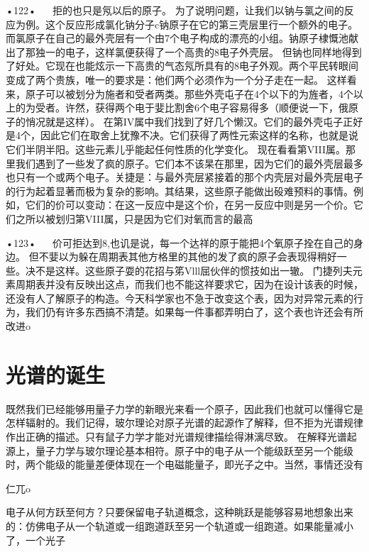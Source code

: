 •122•
  
拒的也只是氖以后的原子。
为了说明问题，让我们以钠与氯之间的反应为例。这个反应形成氯化钠分子c钠原子在它的第三壳层里行一个额外的电子。而氯原子在自己的最外壳层有一个由7个电子构成的漂亮的小组。钠原子棣慨池献出了那独一的电子，这样氯便获得了一个高贵的8电子外壳层。
但钠也同样地得到了好处。它现在也能炫示一下高贵的气态氖所具有的8电子外观。两个平民转眼间变成了两个贵族，唯一的要求是：他们两个必须作为一个分子走在一起。
这样看来，原子可以被划分为施者和受者两类。那些外壳屯子在4个以下的为旌者，4个以上的为受者。许然，获得两个电于婓比割舍6个电子容易得多（顺便说一下，俄原子的悄况就是这样）。
在第IV属中我们找到了好几个懒汉。它们的最外壳屯子正好是4个，因此它们在取舍上犹豫不决。它们获得了两性元索这样的名称，也就是说它们半阴半阳。这些元素儿乎能起任何性质的化学变化。
现在看看第VIII属。那里我们遇到了一些发了疯的原子。它们本不该杲在那里，因为它们的最外壳层最多也只有一个或两个电子。关捷是：与最外壳层紧接着的那个内壳层对最外壳层电子的行为起着显著而极为复杂的影响。其结果，这些原子能做出砓难预料的事情。例如，它们的价可以变动：在这一反应中是这个价，在另一反应中则是另一个价。它们之所以被划归第VIII属，只是因为它们对氧而言的最高

•123•
  
价可拒达到8,也讥是说，每一个达祥的原于能把4个氧原子拴在自己的身边。
但不婓以为躲在周期表其他方格里的其他的发了疯的原子会表现得稍好一些。决不是这样。这些原子耍的花招与笫Vlll屈伙伴的惯技如出一辙。
门捷列夫元素周期表并没有反映出这点，而我们也不能这祥要求它，因为在设计该表的时候，还没有人了解原子的构造。今天科学家也不急于改变这个表，因为对异常元素的行为，我们仍有许多东西搞不清楚。如果每一件事都弄明白了，这个表也许还会有所改进o

\section{光谱的诞生}

既然我们已经能够用量子力学的新眼光来看一个原子，因此我们也就可以懂得它是怎样辐射的。我们记得，玻尔理论对原子光谱的起源作了解释，但不拒为光谱规律作出正确的描述。只有鼠子力学才能对光谱规律描绘得淋漓尽致。
在解释光谱起源上，量子力学与玻尔理论基本相符。原子中的电子从一个能级跃至另一个能级时，两个能级的能量差便体现在一个电磁能量子，即光子之中。当然，事情还没有

仁兀o

电子从何方跃至何方？只要保留电子轨道概念，这种眺跃是能够容易地想象出来的：仿佛电子从一个轨道或一组跑道跃至另一个轨道或一组跑道。如果能量减小了，一个光子

